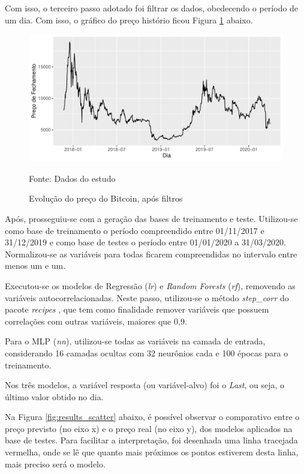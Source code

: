 \documentclass[12pt]{article}
\begin{document}
Com isso, o terceiro passo adotado foi filtrar os dados, obedecendo o período 
de um dia. Com isso, o gráfico do preço histório ficou Figura \ref{fig:dataset}
abaixo.

\begin{figure}[!ht]
  \centering
  \includegraphics[scale = 0.7]{img/dataset.pdf}
  \caption{Evolução do preço do Bitcoin, após filtros}
  Fonte: Dados do estudo
  \label{fig:dataset}
\end{figure}


Após, prosseguiu-se com a geração das bases de treinamento e teste. Utilizou-se 
como base de treinamento o período compreendido entre 01/11/2017 e 31/12/2019 e
como base de testes o período entre 01/01/2020 a 31/03/2020. Normalizou-se as 
variáveis para todas ficarem compreendidas no intervalo entre menos um e um. 

Executou-se os modelos de Regressão (\textit{lr}) e \textit{Random Forests} 
(\textit{rf}), removendo as variáveis autocorrelacionadas. Neste passo, utilizou-se 
o método \textit{step\_corr} do pacote \textit{recipes} \cite{recipes},
que tem como finalidade remover variáveis que possuem correlações com outras variáveis,
maiores que 0,9.

Para o MLP (\textit{nn}), utilizou-se todas as variáveis na camada de entrada, 
considerando 16 camadas ocultas com 32 neurônios cada e 100 épocas para o 
treinamento.

Nos três modelos, a variável resposta (ou variável-alvo) foi o \textit{Last}, 
ou seja, o último valor obtido no dia.

Na Figura \ref{fig:results_scatter} abaixo, é possível observar o comparativo
entre o preço previsto (no eixo x) e o preço real (no eixo y), dos modelos 
aplicados na base de testes. Para facilitar a interpretação, foi desenhada uma 
linha tracejada vermelha, onde se lê que quanto mais próximos os pontos estiverem
desta linha, mais preciso será o modelo.
\end{document}
